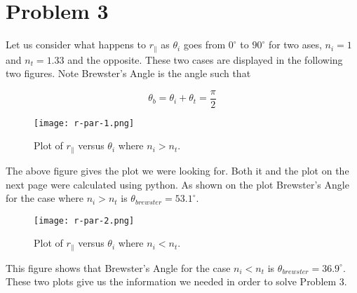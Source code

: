 	\section*{Problem 3}
	
	Let us consider what happens to $r_\parallel$ as $\theta_i$ goes from $0^\circ$ to $90^\circ$ for two ases, $n_i = 1$ and $n_t = 1.33$ and the 
	opposite. These two cases are displayed in the following two figures. Note Brewster's Angle is the angle such that 
	
	$$\theta_b = \theta_i + \theta_t = \frac{\pi}{2}$$
	
	\begin{figure}[!h]
		\centering
			\texttt{[image: r-par-1.png]}
			\caption{Plot of $r_\parallel$ versus $\theta_i$ where $n_i > n_t$.}
	\end{figure}

	The above figure gives the plot we were looking for. Both it and the plot on the next page were calculated using python. As shown on the plot
	Brewster's Angle for the case where $n_i > n_t$ is $\theta_{brewster} = 53.1^\circ$.

	\begin{figure}[!t]
		\centering
			\texttt{[image: r-par-2.png]}
			\caption{Plot of $r_\parallel$ versus $\theta_i$ where $n_i < n_t$.}
	\end{figure}
	
	\pagebreak
	This figure shows that Brewster's Angle for the case $n_i < n_t$ is $\theta_{brewster} = 36.9^\circ$.
	These two plots give us the information we needed in order to solve Problem 3.